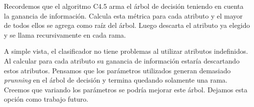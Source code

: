 Recordemos que el algoritmo C4.5 arma el árbol de decisión teniendo en cuenta la ganancia de información. Calcula esta métrica para cada atributo y el mayor de todos ellos se agrega como raíz del árbol. Luego descarta el atributo ya elegido y se llama recursivamente en cada rama. 

A simple vista, el clasificador no tiene problemas al utilizar atributos indefinidos. Al calcular para cada atributo su ganancia de información estaría descartando estos atributos. Pensamos que los parámetros utilizados generan demasiado \textit{prunning} en el árbol de decisión y termina quedando solamente una rama. Creemos que variando los parámetros se podría mejorar este árbol. Dejamos esta opción como trabajo futuro.






